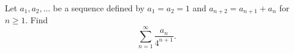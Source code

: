 Let $a_1,a_2,\ldots$ be a sequence defined by $a_1=a_2=1$ and $a_{n+2}=a_{n+1}+a_n$ for $n\geq1$. Find \[\displaystyle\sum_{n=1}^{\infty}\frac{a_n}{4^{n+1}}.\]